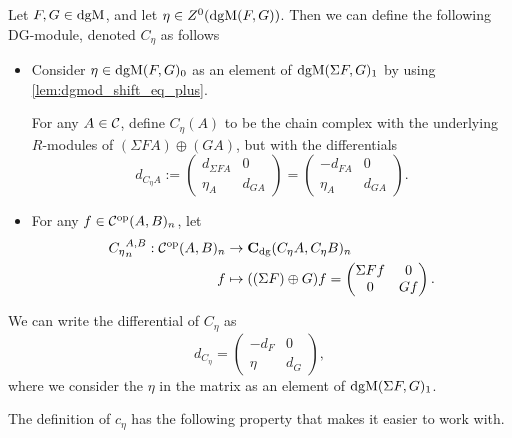 \begin{definition}
    \label{def:dgm_cone}
    Let \( F, G \in \operatorname{dgM} \), and let \( \eta \in Z^0(\operatorname{dgM}(F, G)) \). Then we can define the following DG-module, denoted \( C_{\eta} \) as follows
    \begin{itemize}
        \item {
            Consider \( \eta \in \operatorname{dgM}(F, G)_0 \) as an element of \( \operatorname{dgM}(\Sigma F, G)_1 \) by using \autoref{lem:dgmod_shift_eq_plus}.

            For any \( A \in {\mathcal{C}} \), define \( C_{\eta}(A) \) to be the chain complex with the underlying \( R \)-modules of \( (\Sigma F A) \oplus (G A) \), but with the differentials
            \[
                d_{C_{\eta}A} :=
                \begin{pmatrix}
                    d_{\Sigma F A} & 0 \\
                    \eta_A & d_{GA}
                \end{pmatrix}
                =
                \begin{pmatrix}
                    -d_{F A} & 0 \\
                    \eta_A & d_{GA}
                \end{pmatrix}.
            \]
        }
        \item {
            For any \( f \in {\mathcal{C}}^{\operatorname{op}}(A, B)_n \), let
            \begin{align*}
                {C_{\eta}}_n^{A, B}: {\mathcal{C}}^{\operatorname{op}}(A, B)_n &\to \operatorname{\mathbf{C}}_{\operatorname{dg}}(C_{\eta} A, C_{\eta} B)_n \\
                f &\mapsto ((\Sigma F) \oplus G) f = 
                \begin{pmatrix}
                    \Sigma F f & 0 \\
                    0 & G f
                \end{pmatrix}.
            \end{align*}
        }
    \end{itemize}
\end{definition}

We can write the differential of \( C_{\eta} \) as
\[
    d_{C_{\eta}} =
    \begin{pmatrix}
        -d_F & 0 \\
        \eta & d_G
    \end{pmatrix},
\]
where we consider the \( \eta \) in the matrix as an element of \( \operatorname{dgM}(\Sigma F, G)_1 \).

The definition of \( c_{\eta} \) has the following property that makes it easier to work with.

